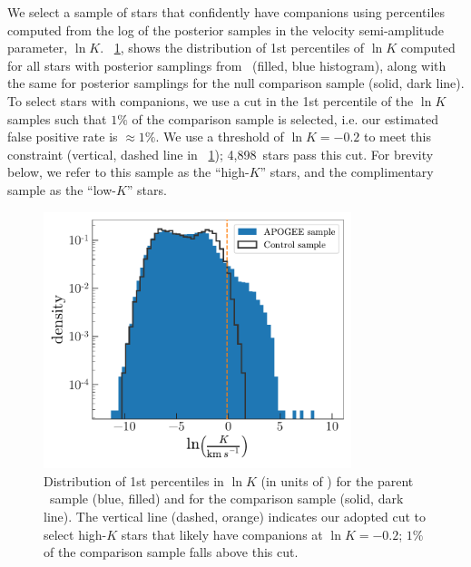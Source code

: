 \documentclass[modern, letterpaper]{aastex62}
\newcommand{\apogee}{\project{\acronym{APOGEE}}}
\newcommand{\thejoker}{\project{The~Joker}}
\newcommand{\lnKcut}{-0.2}
\newcommand{\nhighK}{4,898}
\begin{document}
We select a sample of stars that confidently have companions using percentiles
computed from the log of the posterior samples in the velocity semi-amplitude
parameter, $\ln K$.
\figurename~\ref{fig:lnK-percentiles}, shows the distribution of 1st percentiles
of $\ln K$ computed for all stars with posterior samplings from \thejoker\
(filled, blue histogram), along with the same for posterior samplings for the
null comparison sample (solid, dark line).
To select stars with companions, we use a cut in the 1st percentile of the $\ln
K$ samples such that $1\%$ of the comparison sample is selected, i.e. our
estimated false positive rate is $\approx 1\%$.
We use a threshold of $\ln K = \lnKcut$ to meet this constraint (vertical,
dashed line in \figurename~\ref{fig:lnK-percentiles}); \nhighK\ stars pass this
cut.
For brevity below, we refer to this sample as the ``high-$K$'' stars, and the
complimentary sample as the ``low-$K$'' stars.

\begin{figure}[h]
\begin{center}
\includegraphics[width=0.8\textwidth]{lnK-percentiles}
\end{center}
\caption{%
Distribution of 1st percentiles in $\ln K$ (in units of \kms) for the parent
\apogee\ sample (blue, filled) and for the comparison sample (solid, dark line).
The vertical line (dashed, orange) indicates our adopted cut to select high-$K$
stars that likely have companions at $\ln K = \lnKcut$; $1\%$ of the comparison
sample falls above this cut.
\label{fig:lnK-percentiles}
}
\end{figure}
\end{document}
